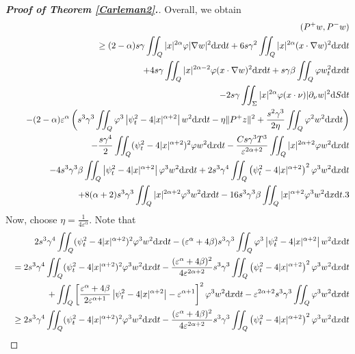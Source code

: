 \documentclass[11pt]{article}
\numberwithin{equation}{section}
\def\pt{\partial}
\def\e{\varepsilon }
\def\vp{\varphi}
\def\bf{\textbf}
\def\pt{\partial}
\def\al{\alpha}
\def\be{\beta}
\def\ga{\gamma}
\def\f{\frac}
\def\df{\mathrm d}
\begin{document}
\begin{proof}[{\rm \bf { Proof of  Theorem \ref{Carleman2}.}}]
			
			
			Overall, we obtain
			\begin{eqnarray*}
				&&(P^+w,P^-w)\\
				&&\geq (2-\alpha)s\ga \iint_Q|x|^{2\al}\vp |\nabla w|^2\df x\df t+6s\ga^2\iint_Q|x|^{2\al}(x\cdot \nabla w)^2\df x\df t\\
				&&\hspace{4.5mm}+4s\ga\iint_Q|x|^{2\al-2}\vp (x\cdot \nabla w)^2\df x\df t +s\ga \be\iint_Q\vp w_t^2\df x\df t\\
				&&\hspace{4.5mm}-2s\ga \iint_\Sigma |x|^{2\al}  \vp (x\cdot \nu)|\pt_\nu w|^2\df S\df t\\
				&&\hspace{4.5mm}-(2-\alpha)\e^\al\left(s^3\ga^3\iint_Q\vp^3\left|\psi_t^2-4|x|^{\al+2}\right|w^2\df x\df t-\eta\|P^+z\|^2+\f{s^2\ga^3}{2\eta}\iint_Q\vp^2w^2\df x\df t\right)\\
				&&\hspace{4.5mm} -\f{s\ga^4}{2}\iint_Q(\psi_t^2-4|x|^{\al+2})^2\vp w^2\df x\df t-\f{Cs\ga^3T^3}{\e^{2\al+2}}\iint_Q |x|^{2\al+2} \vp w^2\df x\df t\\
				&&\hspace{4.5mm}-4s^3\ga^3\be\iint_Q \left|\psi_t^2-4|x|^{\al+2}\right|\vp^3w^2\df x\df t+2s^3\ga^4\iint_Q\left(\psi_t^2-4|x|^{\al+2}\right)^2\vp^3w^2\df x\df t\\
				&&\hspace{4.5mm}+8(\al+2)s^3\ga^3\iint_Q|x|^{2\al+2}\vp^3w^2\df x\df t-16s^3\ga^3\be\iint_Q |x|^{\al+2}\vp^3w^2\df x\df t.
				3	
			\end{eqnarray*}
			Now, choose $\eta=\f{1}{4\e^\al}$. Note that
			\begin{eqnarray*}
				&&2s^3\ga^4\iint_Q(\psi_t^2-4|x|^{\al+2})^2\vp^3w^2\df x\df t-(\e^\al +4\be)s^3\ga^3\iint_Q\vp^3\left|\psi_t^2-4|x|^{\al+2}\right| w^2\df x\df t\\
				&&=2s^3\ga^4\iint_Q(\psi_t^2-4|x|^{\al+2})^2\vp^3w^2\df x\df t- \f{(\e^\al+4\be)^2}{4\e^{2\al+2}}s^3\ga^3\iint_Q\left(\psi_t^2-4|x|^{\al+2}\right)^2\vp^3w^2\df x\df t\\
				&&\hspace{4.5mm} +\iint_Q\left[\f{\e^\al+4\be}{2\e^{\al+1}}\left|\psi_t^2-4|x|^{\al+2}\right|-\e^{\al+1}\right]^2\vp^3w^2\df x\df t-\e^{2\al+2}s^3\ga^3\iint_Q\vp^3w^2\df x\df t\\
				&&\geq 2s^3\ga^4\iint_Q(\psi_t^2-4|x|^{\al+2})^2\vp^3w^2\df x\df t- \f{(\e^\al+4\be)^2}{4\e^{2\al+2}}s^3\ga^3\iint_Q\left(\psi_t^2-4|x|^{\al+2}\right)^2\vp^3w^2\df x\df t\\

\end{eqnarray*}
\end{proof}
\end{document}
